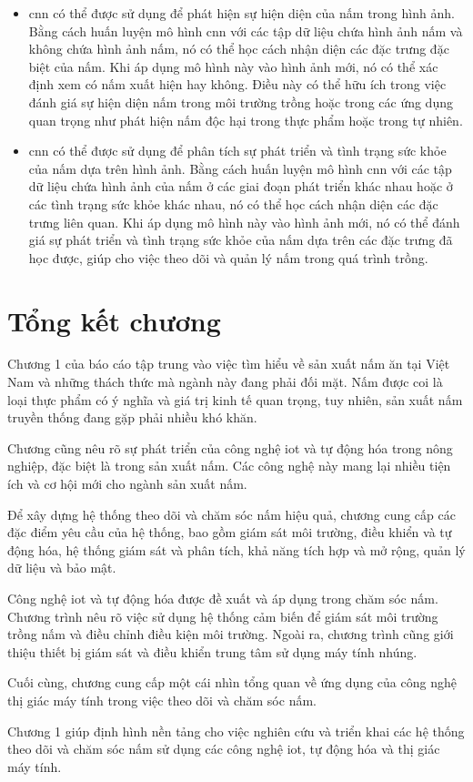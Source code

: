 \begin{itemize}
	\item \acrshort{cnn} có thể được sử dụng để phát hiện sự hiện diện của nấm trong hình ảnh. Bằng cách huấn luyện mô hình \acrshort{cnn} với các tập dữ liệu chứa hình ảnh nấm và không chứa hình ảnh nấm, nó có thể học cách nhận diện các đặc trưng đặc biệt của nấm. Khi áp dụng mô hình này vào hình ảnh mới, nó có thể xác định xem có nấm xuất hiện hay không. Điều này có thể hữu ích trong việc đánh giá sự hiện diện nấm trong môi trường trồng hoặc trong các ứng dụng quan trọng như phát hiện nấm độc hại trong thực phẩm hoặc trong tự nhiên.
	\item \acrshort{cnn} có thể được sử dụng để phân tích sự phát triển và tình trạng sức khỏe của nấm dựa trên hình ảnh. Bằng cách huấn luyện mô hình \acrshort{cnn} với các tập dữ liệu chứa hình ảnh của nấm ở các giai đoạn phát triển khác nhau hoặc ở các tình trạng sức khỏe khác nhau, nó có thể học cách nhận diện các đặc trưng liên quan. Khi áp dụng mô hình này vào hình ảnh mới, nó có thể đánh giá sự phát triển và tình trạng sức khỏe của nấm dựa trên các đặc trưng đã học được, giúp cho việc theo dõi và quản lý nấm trong quá trình trồng.
\end{itemize}

\section{Tổng kết chương}

Chương 1 của báo cáo tập trung vào việc tìm hiểu về sản xuất nấm ăn tại Việt Nam và những thách thức mà ngành này đang phải đối mặt. Nấm được coi là loại thực phẩm có ý nghĩa và giá trị kinh tế quan trọng, tuy nhiên, sản xuất nấm truyền thống đang gặp phải nhiều khó khăn.

Chương cũng nêu rõ sự phát triển của công nghệ \acrfull{iot} và tự động hóa trong nông nghiệp, đặc biệt là trong sản xuất nấm. Các công nghệ này mang lại nhiều tiện ích và cơ hội mới cho ngành sản xuất nấm.

Để xây dựng hệ thống theo dõi và chăm sóc nấm hiệu quả, chương cung cấp các đặc điểm yêu cầu của hệ thống, bao gồm giám sát môi trường, điều khiển và tự động hóa, hệ thống giám sát và phân tích, khả năng tích hợp và mở rộng, quản lý dữ liệu và bảo mật.

Công nghệ \acrshort{iot} và tự động hóa được đề xuất và áp dụng trong chăm sóc nấm. Chương trình nêu rõ việc sử dụng hệ thống cảm biến để giám sát môi trường trồng nấm và điều chỉnh điều kiện môi trường. Ngoài ra, chương trình cũng giới thiệu thiết bị giám sát và điều khiển trung tâm sử dụng máy tính nhúng.

Cuối cùng, chương cung cấp một cái nhìn tổng quan về ứng dụng của công nghệ thị giác máy tính trong việc theo dõi và chăm sóc nấm.

Chương 1 giúp định hình nền tảng cho việc nghiên cứu và triển khai các hệ thống theo dõi và chăm sóc nấm sử dụng các công nghệ \acrshort{iot}, tự động hóa và thị giác máy tính.